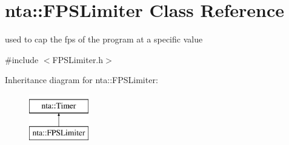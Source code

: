\hypertarget{classnta_1_1FPSLimiter}{}\section{nta\+:\+:F\+P\+S\+Limiter Class Reference}
\label{classnta_1_1FPSLimiter}


used to cap the fps of the program at a specific value  




{\ttfamily \#include $<$F\+P\+S\+Limiter.\+h$>$}

Inheritance diagram for nta\+:\+:F\+P\+S\+Limiter\+:\begin{figure}[H]
\begin{center}
\leavevmode
\includegraphics[height=2.000000cm]{d7/d1f/classnta_1_1FPSLimiter}
\end{center}
\end{figure}

